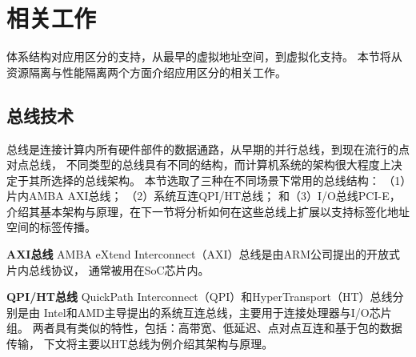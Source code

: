 

\section{相关工作}

体系结构对应用区分的支持，从最早的虚拟地址空间，到虚拟化支持。
本节将从资源隔离与性能隔离两个方面介绍应用区分的相关工作。


\subsection{总线技术}

总线是连接计算内所有硬件部件的数据通路，从早期的并行总线，到现在流行的点对点总线，
不同类型的总线具有不同的结构，而计算机系统的架构很大程度上决定于其所选择的总线架构。
本节选取了三种在不同场景下常用的总线结构：
（1）片内AMBA AXI总线；
（2）系统互连QPI/HT总线；
和（3）I/O总线PCI-E，
介绍其基本架构与原理，在下一节将分析如何在这些总线上扩展以支持标签化地址空间的标签传播。

\textbf{AXI总线} AMBA eXtend Interconnect（AXI）总线是由ARM公司提出的开放式片内总线协议，
通常被用在SoC芯片内。

\textbf{QPI/HT总线} QuickPath Interconnect（QPI）和HyperTransport（HT）总线分别是由
Intel和AMD主导提出的系统互连总线，主要用于连接处理器与I/O芯片组。
两者具有类似的特性，包括：高带宽、低延迟、点对点互连和基于包的数据传输，
下文将主要以HT总线为例介绍其架构与原理。

